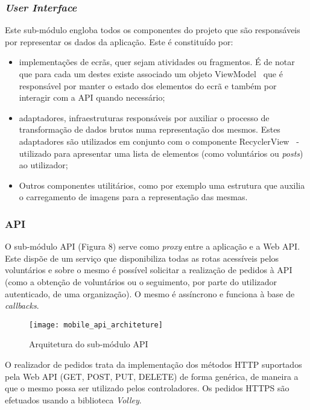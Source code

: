 \subsubsection{\textit{User Interface}}

Este sub-módulo engloba todos os componentes do projeto que são responsáveis por representar os dados da aplicação. Este é constituído por:

\begin{itemize}
	\item implementações de ecrãs, quer sejam atividades ou fragmentos. É de notar que para cada um destes existe associado um objeto ViewModel~\cite{AndroidDevelopers2019} que é responsável por manter o estado dos elementos do ecrã e também por interagir com a API quando necessário; 
	\item adaptadores, infraestruturas responsáveis por auxiliar o processo de transformação de dados brutos numa representação dos mesmos. Estes adaptadores são utilizados em conjunto com o componente RecyclerView~\cite{AndroidDevelopers2020} - utilizado para apresentar uma lista de elementos (como voluntários ou \textit{posts}) ao utilizador;
	\item Outros componentes utilitários, como por exemplo uma estrutura que auxilia o carregamento de imagens para a representação das mesmas.
\end{itemize} 

\subsubsection{API}

O sub-módulo API (Figura 8) serve como \textit{proxy} entre a aplicação e a Web API. Este dispõe de um serviço que disponibiliza todas as rotas acessíveis pelos voluntários e sobre o mesmo é possível solicitar a realização de pedidos à API (como a obtenção de voluntários ou o seguimento, por parte do utilizador autenticado, de uma organização). O mesmo é assíncrono e funciona à base de \textit{callbacks}.

\begin{figure}[h]
	\centering
	\texttt{[image: mobile\_api\_architeture]}
	\caption{Arquitetura do sub-módulo API}
\end{figure}

O realizador de pedidos trata da implementação dos métodos HTTP suportados pela Web API (GET, POST, PUT, DELETE) de forma genérica, de maneira a que o mesmo possa ser utilizado pelos controladores. Os pedidos HTTPS são efetuados usando a biblioteca \textit{Volley}.

